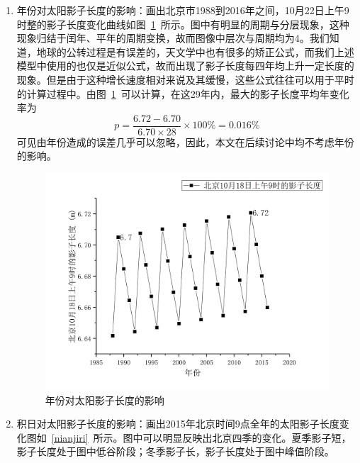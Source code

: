 \documentclass[12pt]{cumcmart}   %
\begin{document}
\begin{enumerate}
	\item 年份对太阳影子长度的影响：画出北京市1988到2016年之间，10月22日上午9时整的影子长度变化曲线如图~\ref{nianfen}~所示。图中有明显的周期与分层现象，这种现象归结于闰年、平年的周期变换，故而图像中层次与周期均为4。我们知道，地球的公转过程是有误差的，天文学中也有很多的矫正公式，而我们上述模型中使用的也仅是近似公式，故而出现了影子长度每四年均上升一定长度的现象。但是由于这种增长速度相对来说及其缓慢，这些公式往往可以用于平时的计算过程中。由图~\ref{nianfen}~可以计算，在这29年内，最大的影子长度平均年变化率为\[p=\frac{6.72-6.70}{6.70\times 28}\times 100\%=0.016\%\]可见由年份造成的误差几乎可以忽略，因此，本文在后续讨论中均不考虑年份的影响。
	\begin{figure}[h]
		\centering
		\includegraphics[scale=0.4]{images/nianfen.png}
		\caption{年份对太阳影子长度的影响}
		\label{nianfen}
	\end{figure}
	\item 积日对太阳影子长度的影响：画出2015年北京时间9点全年的太阳影子长度变化图如~\ref{nianjiri}~所示。图中可以明显反映出北京四季的变化。夏季影子短，影子长度处于图中低谷阶段；冬季影子长，影子长度处于图中峰值阶段。
	      

\end{enumerate}
\end{document}
